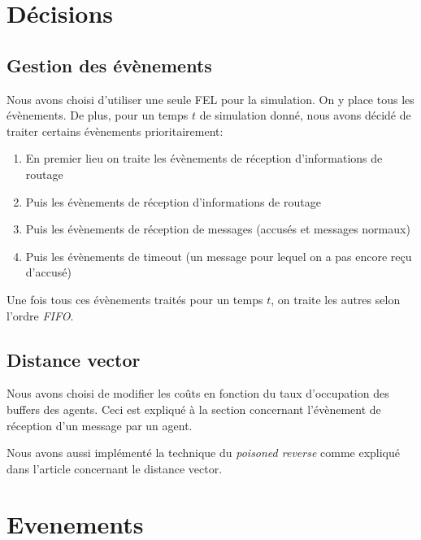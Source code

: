 \documentclass[a4paper,11pt]{article}
\begin{document}

\tableofcontents %
\listoffigures %
\lstlistoflistings
\pagebreak


\section{Décisions}

\subsection{Gestion des évènements}
Nous avons choisi d'utiliser une seule FEL pour la simulation. On y place tous les évènements. De plus, pour un temps $t$ de simulation donné, nous avons décidé de traiter certains évènements prioritairement:

\begin{enumerate}
 \item En premier lieu on traite les évènements de réception d'informations de routage
 \item Puis les évènements de réception d'informations de routage
 \item Puis les évènements de réception de messages (accusés et messages normaux)
 \item Puis les évènements de timeout (un message pour lequel on a pas encore reçu d'accusé)
\end{enumerate}

Une fois tous ces évènements traités pour un temps $t$, on traite les autres selon l'ordre \textit{FIFO}.

\subsection{Distance vector}
Nous avons choisi de modifier les coûts en fonction du taux d'occupation des buffers des agents. Ceci est expliqué à la section  concernant l'évènement de réception d'un message par un agent.

Nous avons aussi implémenté la technique du \textit{poisoned reverse} comme expliqué dans l'article concernant le distance vector.






\section{Evenements}
\end{document}
